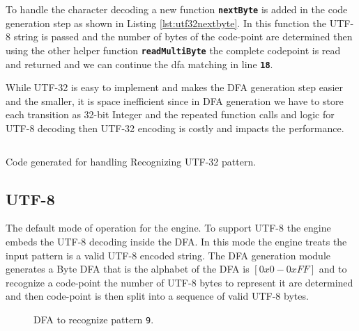 \noindent To handle the character decoding a new function \texttt{\textbf{nextByte}} is added in the  code generation step as shown in Listing \ref{lst:utf32nextbyte}. In this function the UTF-8 string is passed and the number of bytes of the code-point are determined then using the other helper function \texttt{\textbf{readMultiByte}} the complete codepoint is read and returned and we can continue the dfa matching in line \texttt{\textbf{18}}.

While UTF-32 is easy to implement and makes the DFA generation step easier and the smaller, it is space inefficient since in DFA generation we have to store each transition as 32-bit Integer and the repeated function calls and logic for UTF-8 decoding then UTF-32 encoding is costly and impacts the performance. 

\begin{listing}[htbp]
\inputminted[breaklines=true,frame=lines,linenos]{cpp}{code/utf32.cpp}
\caption[Code generated for handling Recognizing UTF-32 pattern]{Code generated for handling Recognizing UTF-32 pattern.}
\label{lst:utf32nextbyte}
\end{listing}

\subsection{UTF-8}
The default mode of operation for the engine. To support UTF-8 the engine embeds the UTF-8 decoding inside the DFA. In this mode the engine treats the input pattern is a valid UTF-8 encoded string. The DFA generation module generates a Byte DFA that is the alphabet of the DFA is $[0x0 - 0xFF]$ and to recognize a code-point the number of UTF-8 bytes to represent it are determined and then code-point is then split into a sequence of valid UTF-8 bytes.

\begin{figure}[htbp]
\centering
\begin{adjustbox}{width=1.1\textwidth,center=\textwidth}
\end{adjustbox}
\caption{DFA to recognize pattern \texttt{9\textvisiblespace \textsterling}.}
\label{fig:utf8exdfa}
\end{figure}

